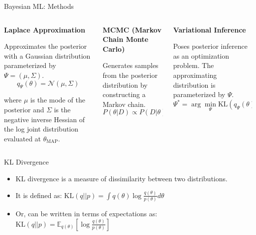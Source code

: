 \documentclass{beamer}
\begin{document}
\begin{frame}{Bayesian ML: Methods}
    \begin{columns}[T]
        \begin{column}{.33\textwidth}
            \textbf{Laplace Approximation}
            
            \vspace{0.2cm}
            Approximates the posterior with a Gaussian distribution parameterized by $\Psi = (\mu, \Sigma)$.
            {\tiny
            \[
                q_{\Psi}(\theta) = \mathcal{N}(\mu, \Sigma)
            \]}
            
            \vspace{0.2cm}
            where $\mu$ is the mode of the posterior and $\Sigma$ is the negative inverse Hessian of the log joint distribution evaluated at $\theta_{\text{MAP}}$.
        \end{column}
        
        \begin{column}{.33\textwidth}
            \textbf{MCMC (Markov Chain Monte Carlo)}
            
            \vspace{0.2cm}
            Generates samples from the posterior distribution by constructing a Markov chain.
            {\tiny
            \[
                P(\theta|D) \propto P(D|\theta)P(\theta)
            \]}
        \end{column}
        
        \begin{column}{.33\textwidth}
            \textbf{Variational Inference}
            
            \vspace{0.5cm}
            Poses posterior inference as an optimization problem. The approximating distribution is parameterized by $\Psi$.
            {\tiny
            \[
                \Psi^* = \arg\min_{\Psi} \text{KL}(q_{\Psi}(\theta)||P(\theta|D))
            \]}
        \end{column}
    \end{columns}
\end{frame}




\begin{frame}{KL Divergence}
    \begin{itemize}
        \item KL divergence is a measure of dissimilarity between two distributions.
        \item It is defined as: $\text{KL}(q||p) = \int q(\theta) \log \frac{q(\theta)}{p(\theta)} d\theta$
        \item Or, can be written in terms of expectations as: $\text{KL}(q||p) = \mathbb{E}_{q(\theta)} \left[ \log \frac{q(\theta)}{p(\theta)} \right]$
    \end{itemize}
    
\end{frame}
\end{document}
